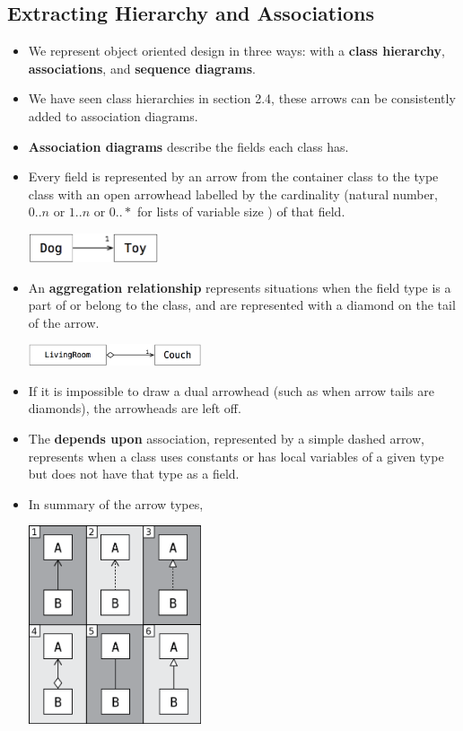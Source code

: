 \documentclass[letterpaper] {article}
\begin{document}
    \subsection{Extracting Hierarchy and Associations}
    \begin{itemize}
        \item We represent object oriented design in three ways: with a \textbf{class hierarchy}, \textbf{associations}, and \textbf{sequence diagrams}. 
        \item We have seen class hierarchies in section 2.4, these arrows can be consistently added to association diagrams. 
        \item \textbf{Association diagrams} describe the fields each class has.
        \item Every field is represented by an arrow from the container class to the type class with an open arrowhead labelled by the cardinality (natural number, $0..n$ or $1..n$ or $0..*$ for lists of variable size ) of that field. 
            \begin{center}
                \includegraphics[width=1.5in]{singleassoc}
            \end{center}
        \item An \textbf{aggregation relationship} represents situations when the field type is a part of or belong to the class, and are represented with a diamond on the tail of the arrow. 
            \begin{center}
                \includegraphics[width=2in]{singleagg}
            \end{center}
        \item If it is impossible to draw a dual arrowhead (such as when arrow tails are diamonds), the arrowheads are left off. 
        \item The \textbf{depends upon} association, represented by a simple dashed arrow, represents when a class uses constants or has local variables of a given type but does not have that type as a field. 
        \item In summary of the arrow types,
            \begin{center}
                \includegraphics[width=2in]{arrowtypes}

\end{center}
\end{itemize}
\end{document}
